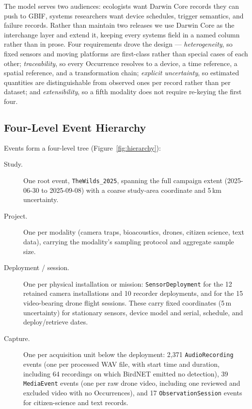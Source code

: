 \documentclass[sigconf]{acmart}
\begin{document}
The model serves two audiences: ecologists want Darwin Core records they
can push to GBIF, systems researchers want device schedules, trigger
semantics, and failure records. Rather than maintain two releases we use
Darwin Core as the interchange layer and extend it, keeping every
systems field in a named column rather than in prose. Four requirements
drove the design --- \emph{heterogeneity}, so fixed sensors and moving
platforms are first-class rather than special cases of each other;
\emph{traceability}, so every Occurrence resolves to a device, a time
reference, a spatial reference, and a transformation chain;
\emph{explicit uncertainty}, so estimated quantities are distinguishable
from observed ones per record rather than per dataset; and
\emph{extensibility}, so a fifth modality does not require re-keying the
first four.

\subsection{Four-Level Event Hierarchy}

Events form a four-level tree (Figure~\ref{fig:hierarchy}):

\begin{description}
\item[Study.] One root event, \texttt{TheWilds\_2025}, spanning the full
campaign extent (2025-06-30 to 2025-09-08) with a coarse study-area
coordinate and 5\,km uncertainty.
\item[Project.] One per modality (camera traps, bioacoustics, drones,
citizen science, text data), carrying the modality's sampling protocol
and aggregate sample size.
\item[Deployment / session.] One per physical installation or mission:
\texttt{SensorDeployment} for the 12 retained camera installations and
10 recorder deployments, and for the 15 video-bearing drone flight sessions. These
carry fixed coordinates (5\,m uncertainty) for stationary sensors,
device model and serial, schedule, and deploy/retrieve dates.
\item[Capture.] One per acquisition unit below the deployment:
2{,}371 \texttt{AudioRecording} events (one per processed WAV file,
with start time and duration, including 64 recordings on which BirdNET
emitted no detection), 39 \texttt{MediaEvent} events (one per raw drone
video, including one reviewed and excluded video with no Occurrences),
and 17 \texttt{ObservationSession} events for citizen-science and text
records.
\end{description}
\end{document}
